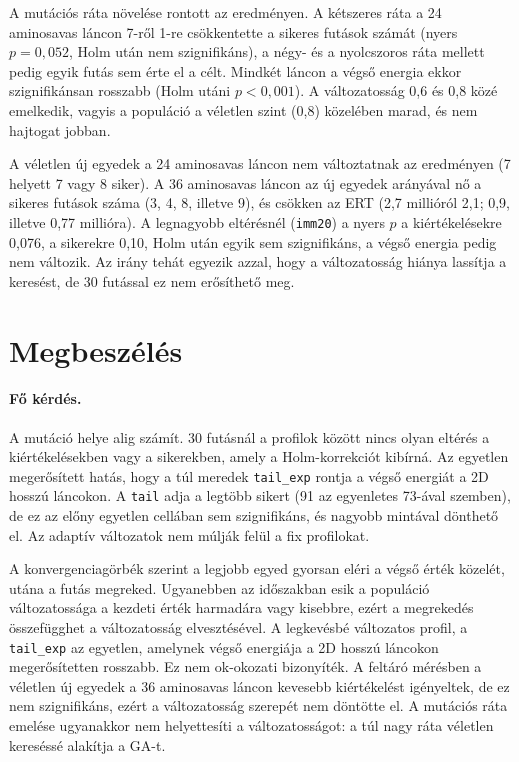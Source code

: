 \documentclass[11pt,a4paper]{article}
\begin{document}
\begin{table}[H]
\centering
\small
\setlength{\tabcolsep}{4pt}

\caption{A változatosság növelésére kipróbált változatok. Siker: a célt elérő futások
száma 30-ból. ERT: ezer kiértékelésben. Energia: a végső energia mediánja. Vált.: a
futás egészére átlagolt változatosság mediánja, amelyben az új egyedek is
szerepelnek. Félkövér: a legjobb érték oszloponként.}
\label{tab:remedies}
\end{table}

A mutációs ráta növelése rontott az eredményen. A kétszeres ráta a 24 aminosavas
láncon 7-ről 1-re csökkentette a sikeres futások számát (nyers $p=0{,}052$, Holm
után nem szignifikáns), a négy- és a nyolcszoros ráta mellett pedig egyik futás sem
érte el a célt. Mindkét láncon a végső energia ekkor szignifikánsan rosszabb (Holm
utáni $p<0{,}001$). A változatosság 0,6 és 0,8 közé emelkedik, vagyis a populáció a
véletlen szint (0,8) közelében marad, és nem hajtogat jobban.

A véletlen új egyedek a 24 aminosavas láncon nem változtatnak az eredményen (7 helyett
7 vagy 8 siker). A 36 aminosavas láncon az új egyedek arányával nő a sikeres futások
száma (3, 4, 8, illetve 9), és csökken az ERT (2,7 millióról 2,1; 0,9, illetve 0,77
millióra). A legnagyobb eltérésnél (\texttt{imm20}) a nyers $p$ a kiértékelésekre
0,076, a sikerekre 0,10, Holm után egyik sem szignifikáns, a végső energia pedig nem
változik. Az irány tehát egyezik azzal, hogy a változatosság hiánya lassítja a
keresést, de 30 futással ez nem erősíthető meg.

\section{Megbeszélés}

\paragraph{Fő kérdés.} A mutáció helye alig számít. 30 futásnál a profilok között
nincs olyan eltérés a kiértékelésekben vagy a sikerekben, amely a Holm-korrekciót
kibírná. Az egyetlen megerősített hatás, hogy a túl meredek \texttt{tail\_exp}
rontja a végső energiát a 2D hosszú láncokon. A \texttt{tail} adja a legtöbb
sikert (91 az egyenletes 73-ával szemben), de ez az előny egyetlen cellában sem
szignifikáns, és nagyobb mintával dönthető el. Az adaptív változatok nem
múlják felül a fix profilokat.

A konvergenciagörbék szerint a legjobb egyed gyorsan eléri a végső érték közelét,
utána a futás megreked. Ugyanebben az időszakban esik a populáció változatossága a
kezdeti érték harmadára vagy kisebbre, ezért a megrekedés összefügghet a
változatosság elvesztésével. A legkevésbé változatos profil, a \texttt{tail\_exp}
az egyetlen, amelynek végső energiája a 2D hosszú láncokon megerősítetten
rosszabb. Ez nem ok-okozati bizonyíték. A feltáró mérésben a véletlen új egyedek a
36 aminosavas láncon kevesebb kiértékelést igényeltek, de ez nem szignifikáns, ezért
a változatosság szerepét nem döntötte el. A mutációs ráta emelése ugyanakkor nem
helyettesíti a változatosságot: a túl nagy ráta véletlen kereséssé alakítja a GA-t.
\end{document}
